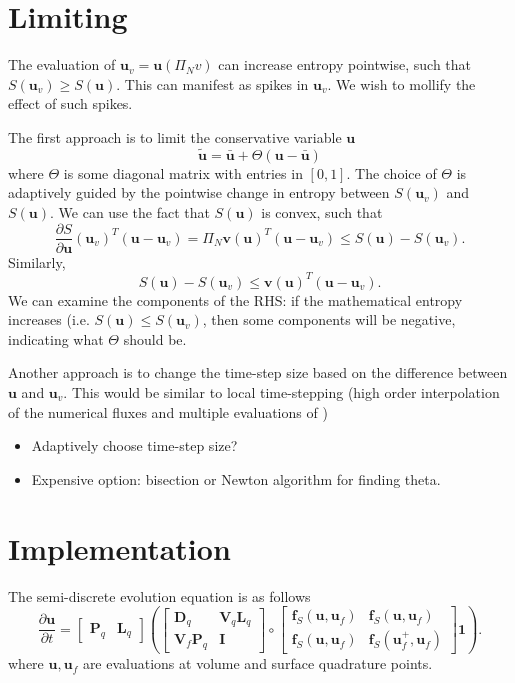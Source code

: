 \documentclass[preprint,10pt]{article}
\theoremstyle{definition}
\theoremstyle{lemma}
\theoremstyle{theorem}
\theoremstyle{assumption}
\newcommand{\pd}[2]{\frac{\partial#1}{\partial#2}}
\newcommand{\LRp}[1]{\left( #1 \right)}
\newcommand{\LRs}[1]{\left[ #1 \right]}
\newcommand{\note}[1]{{\color{blue}{#1}}}
\begin{document}
\section{Limiting}

The evaluation of $\bm{u}_v = \bm{u}\LRp{\Pi_N v}$ can increase entropy pointwise, such that $S(\bm{u}_v) \geq S(\bm{u})$.  This can manifest as spikes in $\bm{u}_v$.  We wish to mollify the effect of such spikes.  

The first approach is to limit the conservative variable $\bm{u}$
\[
\tilde{\bm{u}} = \bar{\bm{u}} + \Theta (\bm{u} - \bar{\bm{u}})
\]
where $\Theta$ is some diagonal matrix with entries in $[0,1]$.  The choice of $\Theta$ is adaptively guided by the pointwise change in entropy between $S(\bm{u}_v)$ and $S(\bm{u})$.  We can use the fact that $S(\bm{u})$ is convex, such that
\[
\pd{S}{\bm{u}}(\bm{u}_v)^T (\bm{u}-\bm{u}_v) = \Pi_N\bm{v}(\bm{u})^T (\bm{u}-\bm{u}_v) \leq S(\bm{u}) - S(\bm{u}_v).  
\]
Similarly,
\[
S(\bm{u}) - S(\bm{u}_v) \leq \bm{v}(\bm{u})^T (\bm{u}-\bm{u}_v).   
\]
We can examine the components of the RHS: if the mathematical entropy increases (i.e. $S(\bm{u}) \leq S(\bm{u}_v)$, then some components will be negative, indicating what $\Theta$ should be.  \note{Todo: figure out proper scaling the diagonal elements of $\Theta$.}  

Another approach is to change the time-step size based on the difference between $\bm{u}$ and $\bm{u}_v$.  This would be similar to local time-stepping (high order interpolation of the numerical fluxes and multiple evaluations of )


\begin{itemize}
\item Adaptively choose time-step size?
\item Expensive option: bisection or Newton algorithm for finding theta.  
\end{itemize}


\section{Implementation}

The semi-discrete evolution equation is as follows
\[
\pd{\bm{u}}{t} = \LRs{\begin{array}{cc}
\bm{P}_q & \bm{L}_q
\end{array}}
\LRp{
\LRs{
\begin{array}{cc}
\bm{D}_q & \bm{V}_q\bm{L}_q\\
\bm{V}_f\bm{P}_q & \bm{I}
\end{array} 
}\circ 
\LRs{
\begin{array}{cc}
\bm{f}_{S}(\bm{u},\bm{u}_f) & \bm{f}_{S}(\bm{u},\bm{u}_f)\\
 \bm{f}_{S}(\bm{u},\bm{u}_f) &  \bm{f}_S(\bm{u}_f^+,\bm{u}_f)
\end{array} 
}\bm{1}}.
\]
where $\bm{u}, \bm{u}_f$ are evaluations at volume and surface quadrature points.  
\end{document}
